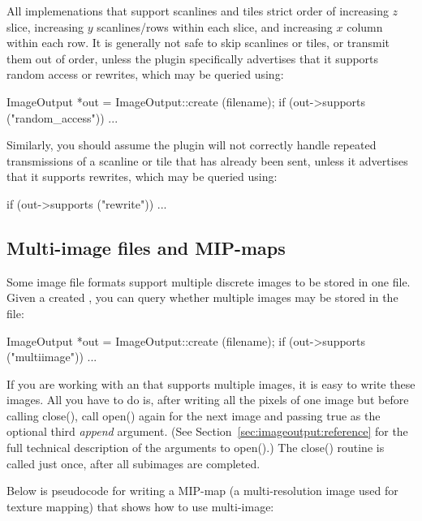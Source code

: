 All \ImageOutput implemenations that support scanlines and tiles strict
order of increasing $z$ slice, increasing $y$ scanlines/rows within each
slice, and increasing $x$ column within each row.  It is generally not
safe to skip scanlines or tiles, or transmit them out of order, unless
the plugin specifically advertises that it supports random access or
rewrites, which may be queried using:

\begin{code}
        ImageOutput *out = ImageOutput::create (filename);
        if (out->supports ("random_access"))
            ...
\end{code}

\noindent Similarly, you should assume the plugin will not correctly
handle repeated transmissions of a scanline or tile that has already
been sent, unless it advertises that it supports rewrites, which may be
queried using:

\begin{code}
        if (out->supports ("rewrite"))
            ...
\end{code}


\subsection{Multi-image files and MIP-maps}
\label{sec:imageoutput:multiimage}

Some image file formats support multiple discrete images to be stored
in one file.  Given a created \ImageOutput, you can query whether
multiple images may be stored in the file:

\begin{code}
        ImageOutput *out = ImageOutput::create (filename);
        if (out->supports ("multiimage"))
            ...
\end{code}

If you are working with an \ImageOutput that supports multiple images,
it is easy to write these images.  All you have to do is, after writing
all the pixels of one image but before calling {\cf close()}, call {\cf
  open()} again for the next image and passing {\cf true} as the
optional third \emph{append} argument.  (See
Section~\ref{sec:imageoutput:reference} for the full technical
description of the arguments to {\cf open()}.)  The {\cf close()}
routine is called just once, after all subimages are completed.

Below is pseudocode for writing a MIP-map (a multi-resolution image
used for texture mapping) that shows how to use multi-image:


